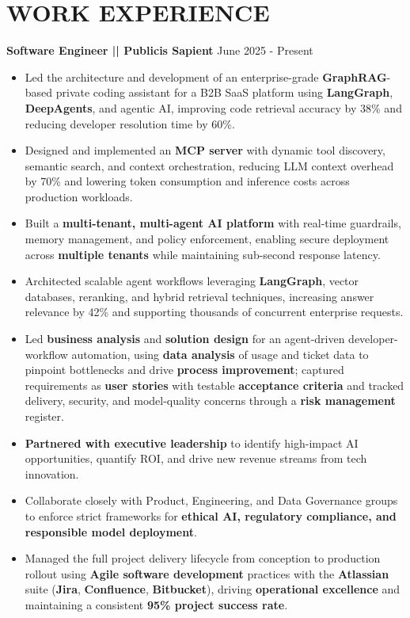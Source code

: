 \documentclass[100pt,a4paper]{article}
\begin{document}
\section*{WORK EXPERIENCE}
\textbf{Software Engineer || Publicis Sapient}
\hfill June 2025 - Present
\begin{itemize}
\vspace{2pt}
\item {Led the architecture and development of an enterprise-grade \textbf{GraphRAG}-based private coding assistant for a B2B SaaS platform using \textbf{LangGraph}, \textbf{DeepAgents}, and agentic AI, improving code retrieval accuracy by 38\% and reducing developer resolution time by 60\%.}
\item {Designed and implemented an \textbf{MCP server} with dynamic tool discovery, semantic search, and context orchestration, reducing LLM context overhead by 70\% and lowering token consumption and inference costs across production workloads.}
\item {Built a \textbf{multi-tenant, multi-agent AI platform} with real-time guardrails, memory management, and policy enforcement, enabling secure deployment across \textbf{multiple tenants} while maintaining sub-second response latency.}
\item {Architected scalable agent workflows leveraging \textbf{LangGraph}, vector databases, reranking, and hybrid retrieval techniques, increasing answer relevance by 42\% and supporting thousands of concurrent enterprise requests.}
\item {Led \textbf{business analysis} and \textbf{solution design} for an agent-driven developer-workflow automation, using \textbf{data analysis} of usage and ticket data to pinpoint bottlenecks and drive \textbf{process improvement}; captured requirements as \textbf{user stories} with testable \textbf{acceptance criteria} and tracked delivery, security, and model-quality concerns through a \textbf{risk management} register.}
\item {\textbf{Partnered with executive leadership} to identify high-impact AI opportunities, quantify ROI, and drive new revenue streams from tech innovation.}
\item {Collaborate closely with Product, Engineering, and Data Governance groups to enforce strict frameworks for \textbf{ethical AI, regulatory compliance, and responsible model deployment}.}
\item {Managed the full project delivery lifecycle from conception to production rollout using \textbf{Agile software development} practices with the \textbf{Atlassian} suite (\textbf{Jira}, \textbf{Confluence}, \textbf{Bitbucket}), driving \textbf{operational excellence} and maintaining a consistent \textbf{95\% project success rate}.}

\end{itemize}
\end{document}
